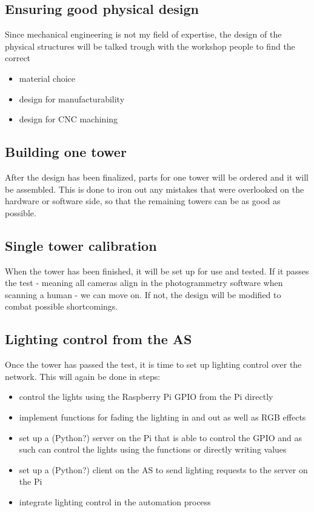 \subsection{Ensuring good physical design}	
	Since mechanical engineering is not my field of expertise, the design of the physical structures will be talked trough with the workshop people to find the correct
	\begin{itemize}
		\item material choice
		\item design for manufacturability
		\item design for CNC machining
	\end{itemize}
	
\subsection{Building one tower}
	After the design has been finalized, parts for one tower will be ordered and it will be assembled. This is done to iron out any mistakes that were overlooked on the hardware or software side, so that the remaining towers can be as good as possible.
	
\subsection{Single tower calibration}
	When the tower has been finished, it will be set up for use and tested. If it passes the test - meaning all cameras align in the photogrammetry software when scanning a human - we can move on. If not, the design will be modified to combat possible shortcomings.
	
\subsection{Lighting control from the AS}
	Once the tower has passed the test, it is time to set up lighting control over the network. This will again be done in steps:
	\begin{itemize}
		\item control the lights using the Raspberry Pi GPIO from the Pi directly
		\item implement functions for fading the lighting in and out as well as RGB effects
		\item set up a (Python?) server on the Pi that is able to control the GPIO and as such can control the lights using the functions or directly writing values
		\item set up a (Python?) client on the AS to send lighting requests to the server on the Pi
		\item integrate lighting control in the automation process
	\end{itemize}
	
